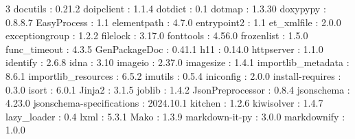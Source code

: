 \begin{multicols}{3}
docutils : 0.21.2\newline
doipclient : 1.1.4\newline
dotdict : 0.1\newline
dotmap : 1.3.30\newline
doxypypy : 0.8.8.7\newline
EasyProcess : 1.1\newline
elementpath : 4.7.0\newline
entrypoint2 : 1.1\newline
et\_xmlfile : 2.0.0\newline
exceptiongroup : 1.2.2\newline
filelock : 3.17.0\newline
fonttools : 4.56.0\newline
frozenlist : 1.5.0\newline
func\_timeout : 4.3.5\newline
GenPackageDoc : 0.41.1\newline
h11 : 0.14.0\newline
httpserver : 1.1.0\newline
identify : 2.6.8\newline
idna : 3.10\newline
imageio : 2.37.0\newline
imagesize : 1.4.1\newline
importlib\_metadata : 8.6.1\newline
importlib\_resources : 6.5.2\newline
imutils : 0.5.4\newline
iniconfig : 2.0.0\newline
install-requires : 0.3.0\newline
isort : 6.0.1\newline
Jinja2 : 3.1.5\newline
joblib : 1.4.2\newline
JsonPreprocessor : 0.8.4\newline
jsonschema : 4.23.0\newline
jsonschema-specifications : 2024.10.1\newline
kitchen : 1.2.6\newline
kiwisolver : 1.4.7\newline
lazy\_loader : 0.4\newline
lxml : 5.3.1\newline
Mako : 1.3.9\newline
markdown-it-py : 3.0.0\newline
markdownify : 1.0.0\newline

\end{multicols}
